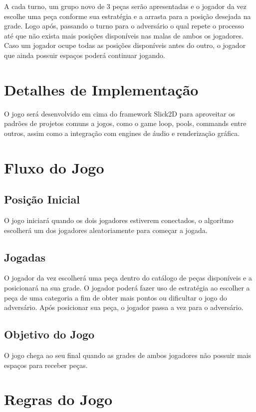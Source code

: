 \documentclass[
	12pt,	
	openany,			
	oneside,			
	a4paper,			
	english,			
	french,			
	spanish,			
	brazil,	
	]{abntex2}
\begin{document}
A cada turno, um grupo novo de 3 peças serão apresentadas e o jogador da vez escolhe uma peça conforme sua estratégia e a arrasta para a posição desejada na grade. Logo após, passando o turno para o adversário o qual repete o processo até que não exista mais posições disponíveis nas malas de ambos os jogadores. Caso um jogador ocupe todas as posições disponíveis antes do outro, o jogador que ainda possuir espaços poderá continuar jogando.
 
\section{Detalhes de Implementação}

O jogo será desenvolvido em cima do framework Slick2D para aproveitar os padrões de projetos comuns a jogos, como o game loop, pools, commands entre outros, assim como a integração com engines de áudio e renderização gráfica.

\section{Fluxo do Jogo}

\subsection{Posição Inicial}

O jogo iniciará quando os dois jogadores estiverem conectados, o algoritmo escolherá um dos jogadores aleatoriamente para começar a jogada. 

\subsection{Jogadas}

O jogador da vez escolherá uma peça dentro do catálogo de peças disponíveis e a posicionará na sua grade. O jogador poderá fazer uso de estratégia ao escolher a peça de uma categoria a fim de obter mais pontos ou dificultar o jogo do adversário. Após posicionar sua peça, o jogador passa a vez para o adversário.

\subsection{Objetivo do Jogo}

O jogo chega ao seu final quando as grades de ambos jogadores não possuir mais espaços para receber peças.

\section{Regras do Jogo}
\end{document}
